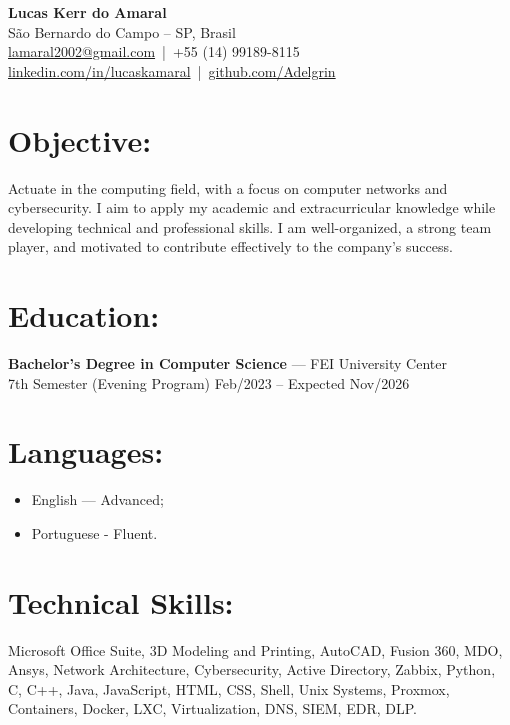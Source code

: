 \documentclass[11pt,a4paper]{article}
\begin{document}
\newpage
{}

\begin{center}
    {\LARGE \textbf{Lucas Kerr do Amaral}}\\[6pt]
    São Bernardo do Campo -- SP, Brasil\\
    \href{mailto:lamaral2002@gmail.com}{lamaral2002@gmail.com} \,|\, 
    +55 (14) 99189-8115\\
    \href{https://www.linkedin.com/in/lucaskamaral}{linkedin.com/in/lucaskamaral} \,|\, 
    \href{https://github.com/Adelgrin}{github.com/Adelgrin}
\end{center}
\section*{Objective:}

Actuate in the computing field, with a focus on computer networks and cybersecurity. I aim to apply my academic and extracurricular knowledge while developing technical and professional skills. I am well-organized, a strong team player, and motivated to contribute effectively to the company’s success.

\section*{Education:}

\textbf{Bachelor’s Degree in Computer Science} — FEI University Center\\
7th Semester (Evening Program) \hfill Feb/2023 -- Expected Nov/2026

\section*{Languages:}

\begin{itemize}
	\item English — Advanced;
	\item Portuguese - Fluent.
\end{itemize}

\section*{Technical Skills:}

Microsoft Office Suite, 3D Modeling and Printing, AutoCAD, Fusion 360, MDO, Ansys,
Network Architecture, Cybersecurity, Active Directory, Zabbix, Python, C, C++, Java,
JavaScript, HTML, CSS, Shell, Unix Systems, Proxmox, Containers, Docker, LXC,
Virtualization, DNS, SIEM, EDR, DLP.
\end{document}
